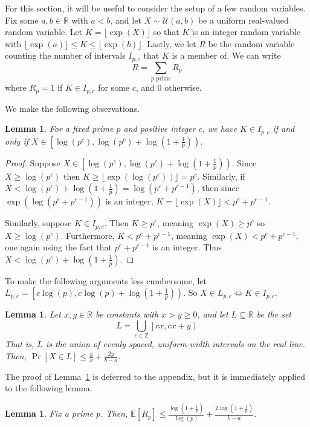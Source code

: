 \documentclass{article}
\newcommand{\Z}{\mathbb{Z}}
\newcommand{\E}{\mathbb{E}}
\newtheorem{lemma}[theorem]{Lemma}
\theoremstyle{definition}
\theoremstyle{remark}
\numberwithin{equation}{section}
\numberwithin{case}{theorem}
\begin{document}
For this section, it will be useful to consider the setup of a few random variables. Fix some $a, b \in \mathbb{R}$ with $a < b$, and let $X \sim \mathcal{U}(a, b)$ be a uniform real-valued random variable. Let $K = \lfloor \exp(X) \rfloor$ so that $K$ is an integer random variable with $\lfloor \exp(a) \rfloor \leq K \leq \lfloor \exp(b) \rfloor$. Lastly, we let $R$ be the random variable counting the number of intervals $I_{p, c}$ that $K$ is a member of. We can write
\[
    R = \sum_{p \text{ prime}} R_p
\]
where $R_p = 1$ if $K \in I_{p, c}$ for some $c$, and $0$ otherwise.

We make the following observations.

\begin{lemma} \label{lem:loguniform}
    For a fixed prime $p$ and positive integer $c$, we have $K \in I_{p, c}$ if and only if $X \in \left[\log(p^c), \log(p^c) + \log\left(1+\frac{1}{p}\right)\right)$.
\end{lemma}

\begin{proof}
    Suppose $X \in \left[\log(p^c), \log(p^c) + \log\left(1+\frac{1}{p}\right)\right)$. Since $X \geq \log(p^c)$ then $K \geq \lfloor \exp(\log(p^c)) \rfloor = p^c$. Similarly, if $X < \log(p^c) + \log\left(1+\frac{1}{p}\right) = \log(p^c + p^{c-1})$, then since $\exp(\log(p^c + p^{c-1}))$ is an integer, $K = \lfloor\exp(X)\rfloor < p^c + p^{c-1}$.

    Similarly, suppose $K \in I_{p, c}$. Then $K \geq p^c$, meaning $\exp(X) \geq p^c$ so $X \geq \log(p^c)$. Furthermore, $K < p^c + p^{c-1}$, meaning $\exp(X) < p^c + p^{c-1}$, one again using the fact that $p^c + p^{c-1}$ is an integer. Thus $X < \log(p^c) + \log\left(1 + \frac1p\right)$.
\end{proof}

To make the following arguments less cumbersome, let $L_{p, c} = \left[c\log(p), c\log(p) + \log\left(1+\frac{1}{p}\right)\right)$. So $X \in L_{p,c} \Leftrightarrow K \in I_{p, c}$.


\begin{lemma} \label{lem:uniformintervals}
    Let $x, y \in \mathbb{R}$ be constants with $x > y \geq 0$, and let $L \subseteq \mathbb{R}$ be the set
    \[
        L = \bigcup_{c \in \Z} \left[ cx, cx + y \right)
    \]
    That is, $L$ is the union of evenly spaced, uniform-width intervals on the real line. Then, $\Pr[X \in L] \leq \frac{y}{x} + \frac{2y}{b-a}$.
\end{lemma}

The proof of Lemma~\ref{lem:uniformintervals} is deferred to the appendix, but it is immediately applied to the following lemma.
\begin{lemma} \label{lem:rp_bound}
    Fix a prime $p$. Then, $\E[R_p] \leq \frac{\log\left(1 + \frac{1}{p}\right)}{\log(p)} + \frac{2\log\left(1 + \frac{1}{p}\right)}{b - a}$.
\end{lemma}
\end{document}
